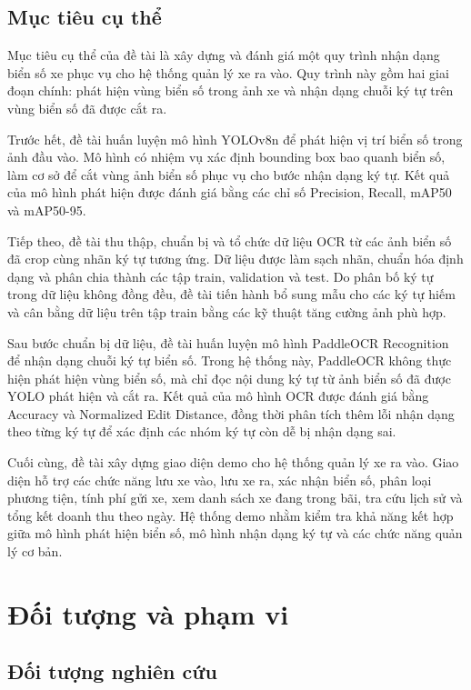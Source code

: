\documentclass[13pt,a4paper]{report}
\begin{document}
\subsection{Mục tiêu cụ thể}

Mục tiêu cụ thể của đề tài là xây dựng và đánh giá một quy trình nhận dạng biển số xe phục vụ cho hệ thống quản lý xe ra vào. Quy trình này gồm hai giai đoạn chính: phát hiện vùng biển số trong ảnh xe và nhận dạng chuỗi ký tự trên vùng biển số đã được cắt ra.

Trước hết, đề tài huấn luyện mô hình YOLOv8n để phát hiện vị trí biển số trong ảnh đầu vào. Mô hình có nhiệm vụ xác định bounding box bao quanh biển số, làm cơ sở để cắt vùng ảnh biển số phục vụ cho bước nhận dạng ký tự. Kết quả của mô hình phát hiện được đánh giá bằng các chỉ số Precision, Recall, mAP50 và mAP50-95.

Tiếp theo, đề tài thu thập, chuẩn bị và tổ chức dữ liệu OCR từ các ảnh biển số đã crop cùng nhãn ký tự tương ứng. Dữ liệu được làm sạch nhãn, chuẩn hóa định dạng và phân chia thành các tập train, validation và test. Do phân bố ký tự trong dữ liệu không đồng đều, đề tài tiến hành bổ sung mẫu cho các ký tự hiếm và cân bằng dữ liệu trên tập train bằng các kỹ thuật tăng cường ảnh phù hợp.

Sau bước chuẩn bị dữ liệu, đề tài huấn luyện mô hình PaddleOCR Recognition để nhận dạng chuỗi ký tự biển số. Trong hệ thống này, PaddleOCR không thực hiện phát hiện vùng biển số, mà chỉ đọc nội dung ký tự từ ảnh biển số đã được YOLO phát hiện và cắt ra. Kết quả của mô hình OCR được đánh giá bằng Accuracy và Normalized Edit Distance, đồng thời phân tích thêm lỗi nhận dạng theo từng ký tự để xác định các nhóm ký tự còn dễ bị nhận dạng sai.

Cuối cùng, đề tài xây dựng giao diện demo cho hệ thống quản lý xe ra vào. Giao diện hỗ trợ các chức năng lưu xe vào, lưu xe ra, xác nhận biển số, phân loại phương tiện, tính phí gửi xe, xem danh sách xe đang trong bãi, tra cứu lịch sử và tổng kết doanh thu theo ngày. Hệ thống demo nhằm kiểm tra khả năng kết hợp giữa mô hình phát hiện biển số, mô hình nhận dạng ký tự và các chức năng quản lý cơ bản.


\section{Đối tượng và phạm vi}

\subsection{Đối tượng nghiên cứu}
\end{document}
